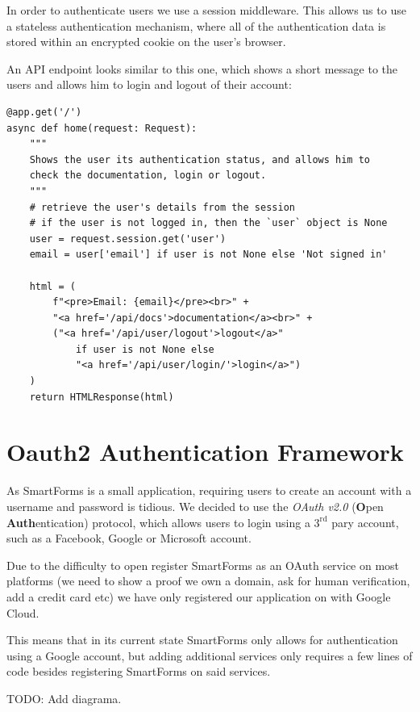 \documentclass[12pt, a4paper]{report}
\begin{document}
In order to authenticate users we use a session middleware. This allows us to use a stateless authentication mechanism, where all of the authentication data is stored within an encrypted cookie on the user's browser.

An API endpoint looks similar to this one, which shows a short message to the users and allows him to login and logout of their account:

\begin{verbatim}
@app.get('/')
async def home(request: Request):
    """
    Shows the user its authentication status, and allows him to
    check the documentation, login or logout.
    """
    # retrieve the user's details from the session
    # if the user is not logged in, then the `user` object is None
    user = request.session.get('user')
    email = user['email'] if user is not None else 'Not signed in'

    html = (
        f"<pre>Email: {email}</pre><br>" +
        "<a href='/api/docs'>documentation</a><br>" +
        ("<a href='/api/user/logout'>logout</a>"
            if user is not None else
            "<a href='/api/user/login/'>login</a>")
    )
    return HTMLResponse(html)
\end{verbatim}

\section{Oauth2 Authentication Framework}

As SmartForms is a small application, requiring users to create an account with a username and password is tidious. We decided to use the \textit{OAuth v2.0}\cite{oauth2} (\textbf{O}pen \textbf{Auth}entication) protocol, which allows users to login using a $3^\textrm{rd}$ pary account, such as a Facebook, Google or Microsoft account.

Due to the difficulty to open register SmartForms as an OAuth service on most platforms (we need to show a proof we own a domain, ask for human verification, add a credit card etc) we have only registered our application on with Google Cloud.

This means that in its current state SmartForms only allows for authentication using a Google account, but adding additional services only requires a few lines of code besides registering SmartForms on said services.

TODO: Add diagrama.

\end{document}
